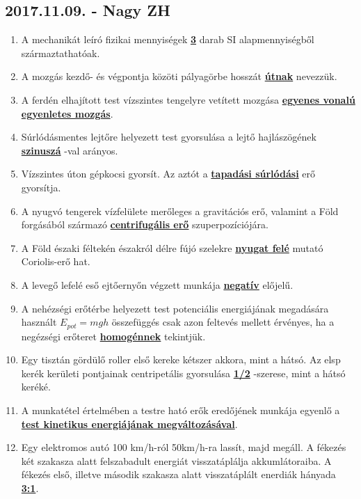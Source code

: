 \documentclass[../../fizika_kerdesek.tex]{subfiles}
\begin{document}
    \subsection{2017.11.09. - Nagy ZH}

        \begin{enumerate}
            \item A mechanikát leíró fizikai mennyiségek \underline{\textbf{3}} darab SI alapmennyiségből származtathatóak.
            \item A mozgás kezdő- és végpontja közöti pályagörbe hosszát \underline{\textbf{útnak}} nevezzük.
            \item A ferdén elhajított test vízszintes tengelyre vetített mozgása \underline{\textbf{egyenes vonalú egyenletes mozgás}}.
            \item Súrlódásmentes lejtőre helyezett test gyorsulása a lejtő hajlászögének \underline{\textbf{szinuszá}} -val arányos.
            \item Vízszintes úton gépkocsi gyorsít. Az aztót a \underline{\textbf{tapadási súrlódási}} erő gyorsítja. 
            \sloppy\item A nyugvó tengerek vízfelülete merőleges a gravitációs erő, valamint a Föld forgásából származó \underline{\textbf{centrifugális erő}} szuperpozíciójára.
            \item A Föld északi féltekén északról délre fújó szelekre \underline{\textbf{nyugat felé}} mutató Coriolis-erő hat.
            \item A levegő lefelé eső ejtőernyőn végzett munkája \underline{\textbf{negatív}} előjelű.
            \item A nehézségi erőtérbe helyezett test potenciális energiájának megadására használt $E_{pot}=mgh$ összefüggés csak azon feltevés mellett érvényes, ha a negézségi erőteret \underline{\textbf{homogénnek}} tekintjük.
            \item Egy tisztán gördülő roller első kereke kétszer akkora, mint a hátsó. Az elsp kerék kerületi pontjainak centripetális gyorsulása \underline{\textbf{1/2}} -szerese, mint a hátsó keréké.
            \item A munkatétel értelmében a testre ható erők eredőjének munkája egyenlő a \underline{\textbf{test kinetikus energiájának megváltozásával}}.
            \item Egy elektromos autó 100 km/h-ról 50km/h-ra lassít, majd megáll. A fékezés két szakasza alatt felszabadult energiát visszatáplálja akkumlátoraiba. A fékezés első, illetve második szakasza alatt visszatáplált enerdiák hányada \underline{\textbf{3:1}}.
        \end{enumerate}
\end{document}

